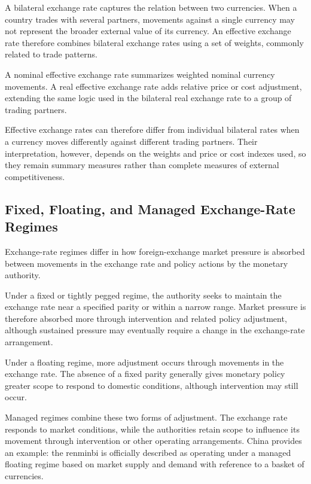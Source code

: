 A bilateral exchange rate captures the relation between two currencies. When a country trades with several partners, movements against a single currency may not represent the broader external value of its currency. An effective exchange rate therefore combines bilateral exchange rates using a set of weights, commonly related to trade patterns.

A nominal effective exchange rate summarizes weighted nominal currency movements. A real effective exchange rate adds relative price or cost adjustment, extending the same logic used in the bilateral real exchange rate to a group of trading partners.

Effective exchange rates can therefore differ from individual bilateral rates when a currency moves differently against different trading partners. Their interpretation, however, depends on the weights and price or cost indexes used, so they remain summary measures rather than complete measures of external competitiveness.


\subsection{Fixed, Floating, and Managed Exchange-Rate Regimes}

Exchange-rate regimes differ in how foreign-exchange market pressure is absorbed between movements in the exchange rate and policy actions by the monetary authority.

Under a fixed or tightly pegged regime, the authority seeks to maintain the exchange rate near a specified parity or within a narrow range. Market pressure is therefore absorbed more through intervention and related policy adjustment, although sustained pressure may eventually require a change in the exchange-rate arrangement.

Under a floating regime, more adjustment occurs through movements in the exchange rate. The absence of a fixed parity generally gives monetary policy greater scope to respond to domestic conditions, although intervention may still occur.

Managed regimes combine these two forms of adjustment. The exchange rate responds to market conditions, while the authorities retain scope to influence its movement through intervention or other operating arrangements. China provides an example: the renminbi is officially described as operating under a managed floating regime based on market supply and demand with reference to a basket of currencies.

